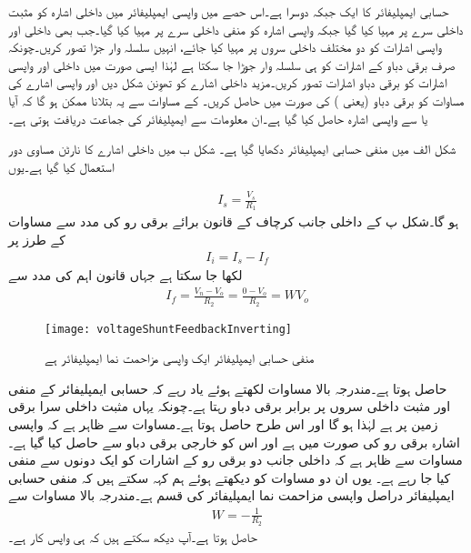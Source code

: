 حسابی ایمپلیفائر کا ایک  جبکہ دوسرا  ہے۔اس حصے میں واپسی ایمپلیفائر میں داخلی اشارہ  کو مثبت داخلی سرے  پر مہیا کیا گیا جبکہ واپسی اشارہ  کو منفی داخلی سرے پر مہیا کیا گیا۔جب بھی داخلی اور واپسی اشارات کو دو مختلف داخلی سروں  پر مہیا کیا جائے، انہیں سلسلہ وار جڑا تصور کریں۔چونکہ صرف برقی دباو کے اشارات کو ہی سلسلہ وار جوڑا جا سکتا ہے لہٰذا ایسی صورت میں داخلی اور واپسی اشارات کو برقی دباو اشارات تصور کریں۔مزید داخلی اشارے کو تھوِنن  شکل دیں اور واپسی اشارے کی مساوات کو برقی دباو (یعنی )  کی صورت میں حاصل کریں۔  کے مساوات سے یہ بتلانا ممکن ہو گا کہ آیا  یا  سے واپسی اشارہ حاصل کیا گیا ہے۔ان معلومات سے ایمپلیفائر کی جماعت دریافت ہوتی ہے۔

شکل  الف میں منفی حسابی ایمپلیفائر دکھایا گیا ہے۔ شکل  ب میں داخلی اشارے کا نارٹن مساوی دور استعمال کیا گیا ہے۔یوں

\begin{align} \label{مساوات_واپسی_داخلی_نارٹن_اشارہ}
I_s=\frac{V_s}{R_1}
\end{align}
ہو گا۔شکل  پ کے داخلی جانب کرچاف کے قانون برائے برقی رو کی مدد سے مساوات  کے طرز پر
\begin{align} \label{مساوات_واپسی_واپسی_مزاحمت_نما_ایمپلیفائر_کی_جماعت_بندی}
I_i=I_s-I_f
\end{align}
لکھا جا سکتا ہے جہاں قانون اہم کی مدد سے 
\begin{align} \label{مساوات_واپسی_منفی_واپس_کار}
I_f=\frac{V_n-V_o}{R_2}=\frac{0-V_o}{R_2}=W V_o
\end{align}
%
\begin{figure}
\centering
\texttt{[image: voltageShuntFeedbackInverting]}
\caption{منفی حسابی ایمپلیفائر ایک واپسی مزاحمت نما ایمپلیفائر ہے}
\label{شکل_واپسی_منفی_واپسی_ایمپلیفائر}
\end{figure}
%
حاصل ہوتا ہے۔مندرجہ بالا مساوات لکھتے ہوئے یاد رہے کہ حسابی ایمپلیفائر کے منفی اور مثبت داخلی سروں  پر برابر برقی دباو رہتا ہے۔چونکہ یہاں مثبت داخلی سرا برقی زمین پر ہے لہٰذا  ہو گا اور اس طرح  حاصل ہوتا ہے۔مساوات  سے ظاہر ہے کہ واپسی اشارہ برقی رو کی صورت میں ہے اور اس کو خارجی برقی دباو سے حاصل کیا گیا ہے۔مساوات  سے ظاہر ہے کہ داخلی جانب دو برقی رو کے اشارات کو ایک دونوں سے منفی کیا جا رہے ہے۔  یوں ان دو مساوات کو دیکھتے ہوئے ہم کہہ سکتے ہیں کہ منفی حسابی ایمپلیفائر دراصل واپسی مزاحمت نما ایمپلیفائر کی قسم ہے۔مندرجہ بالا مساوات سے
\begin{align}
W=-\frac{1}{R_2}
\end{align}
حاصل ہوتا ہے۔آپ دیکھ سکتے ہیں کہ  ہی واپس کار ہے۔

